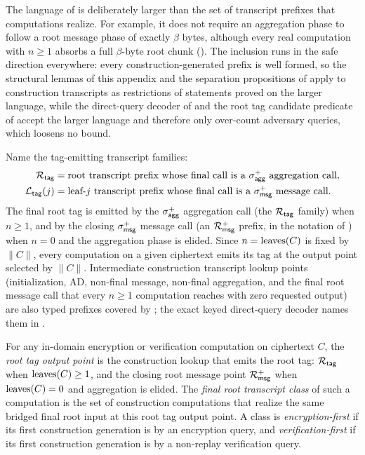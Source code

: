 \begin{remark}
\label{rem:wf-vs-realizable}
The language of  is deliberately larger than
the set of transcript prefixes that \TW{} computations realize. For
example, it does not require an aggregation phase to follow a root
message phase of exactly $\beta$ bytes, although every real computation
with $n \geq 1$ absorbs a full $\beta$-byte root chunk ().
The inclusion runs in the safe direction everywhere: every
construction-generated prefix is well formed, so the structural lemmas
of this appendix and the separation propositions of
 apply to construction transcripts as
restrictions of statements proved on the larger language, while the
direct-query decoder of  and the root tag
candidate predicate of  accept the larger
language and therefore only over-count adversary queries, which loosens
no bound.
\end{remark}

Name the tag-emitting transcript families:
\begin{align*}
  \mathcal{R}_{\mathsf{tag}}   &= \text{root transcript prefix whose final call is a \ensuremath{\sigma_{\mathsf{agg}}^+}{} aggregation call}, \\
  \mathcal{L}_{\mathsf{tag}}(j)   &= \text{leaf-$j$ transcript prefix whose final call is a \ensuremath{\sigma_{\mathsf{msg}}^+}{} message call}.
\end{align*}
The final root tag is emitted by the $\sigma_{\mathsf{agg}}^+$ aggregation call (the
$\mathcal{R}_{\mathsf{tag}}$ family) when $n \geq 1$, and by the closing $\sigma_{\mathsf{msg}}^+$
message call (an $\mathcal{R}_{\mathsf{msg}}^+$ prefix, in the notation of
) when $n = 0$ and the aggregation phase is elided.
Since $n = \operatorname{leaves}(C)$ is fixed by $\|C\|$, every computation on a given
ciphertext emits its tag at the output point selected by $\|C\|$.
Intermediate construction transcript lookup points (initialization, AD,
non-final message, non-final aggregation, and the final root message
call that every $n \geq 1$ computation reaches with zero requested
output) are also typed prefixes covered by ;
the exact keyed direct-query decoder names them in
.

\begin{definition}
\label{def:root-tag-output-point}
For any in-domain encryption or verification computation on ciphertext
$C$, the \emph{root tag output point} is the construction lookup that
emits the root tag: $\mathcal{R}_{\mathsf{tag}}$ when $\operatorname{leaves}(C) \geq 1$, and the closing
root message point $\mathcal{R}_{\mathsf{msg}}^+$ when $\operatorname{leaves}(C) = 0$ and aggregation is
elided. The \emph{final root transcript class} of such a computation is
the set of construction computations that realize the same bridged final
root input at this root tag output point. A class is
\emph{encryption-first} if its first construction generation is by an
encryption query, and \emph{verification-first} if its first construction
generation is by a non-replay verification query.
\end{definition}

